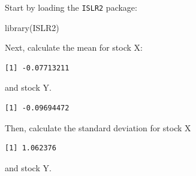 \documentclass[
  letterpaper,
  DIV=11,
  numbers=noendperiod]{scrreprt}
\newenvironment{Shaded}{\begin{snugshade}}{\end{snugshade}}
\newcommand{\FunctionTok}[1]{\textcolor[rgb]{0.28,0.35,0.67}{#1}}
\newcommand{\NormalTok}[1]{\textcolor[rgb]{0.00,0.23,0.31}{#1}}
\newcommand{\SpecialCharTok}[1]{\textcolor[rgb]{0.37,0.37,0.37}{#1}}
\begin{document}
Start by loading the \texttt{ISLR2} package:

\begin{Shaded}
\begin{Highlighting}[numbers=left,,]
\FunctionTok{library}\NormalTok{(ISLR2)}
\end{Highlighting}
\end{Shaded}

Next, calculate the mean for stock X:

\begin{Shaded}
\end{Shaded}

\begin{verbatim}
[1] -0.07713211
\end{verbatim}

and stock Y.

\begin{Shaded}
\end{Shaded}

\begin{verbatim}
[1] -0.09694472
\end{verbatim}

Then, calculate the standard deviation for stock X

\begin{Shaded}
\end{Shaded}

\begin{verbatim}
[1] 1.062376
\end{verbatim}

and stock Y.

\begin{Shaded}
\end{Shaded}
\end{document}
